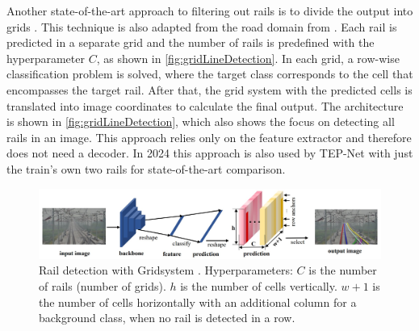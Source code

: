 \vspace{1cm}

Another state-of-the-art approach to filtering out rails is to divide the output into grids \cite{li2022rail}.
This technique is also adapted from the road domain from \cite{laneDetectionGrid2020}.
Each rail is predicted in a separate grid and the number of rails is predefined with the hyperparameter $C$, as shown in \autoref{fig:gridLineDetection}.
In each grid, a row-wise classification problem is solved, where the target class corresponds to the cell that encompasses the target rail.
After that, the grid system with the predicted cells is translated into image coordinates to calculate the final output.
The architecture is shown in \autoref{fig:gridLineDetection}, which also shows the focus on detecting all rails in an image.
This approach relies only on the feature extractor and therefore does not need a decoder.
In 2024 this approach is also used by TEP-Net \cite{tepNet2024} with just the train's own two rails for state-of-the-art comparison.

\begin{figure}[H]
    \centering
    \includegraphics[width=\linewidth]{PICs/lineDetection/gridDetection.jpg}
    \caption{Rail detection with Gridsystem \cite{li2022rail}. Hyperparameters: $C$ is the number of rails (number of grids). $h$ is the number of cells vertically. $w+1$ is the number of cells horizontally with an additional column for a background class, when no rail is detected in a row.}
    \label{fig:gridLineDetection}
\end{figure}

